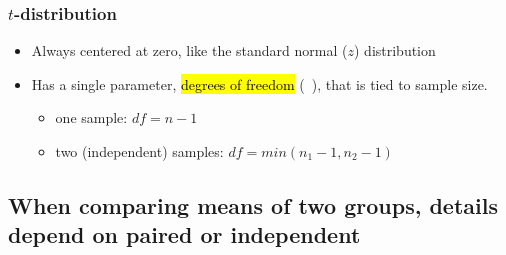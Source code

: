 \documentclass[11pt,containsverbatim,handout,xcolor=xelatex,dvipsnames,table]{beamer}
\newcommand{\soln}[1]{}
\begin{document}

\begin{frame}
\frametitle{$t$-distribution}

\begin{itemize}

\item Always centered at zero, like the standard normal ($z$) distribution

\pause

\item Has a single parameter, \hl{degrees of freedom} (~), that is tied to sample size.
\begin{itemize}
\item one sample: $df = n - 1$
\item two (independent) samples: $df = min(n_1 - 1, n_2 - 1)$
\end{itemize}

\end{itemize}

\pause

{
\soln{\pause Approaches normal.}
\pause
{}
}

\end{frame}


\subsection{When comparing means of two groups, details depend on paired or independent}
\label{mi2}

\end{document}
